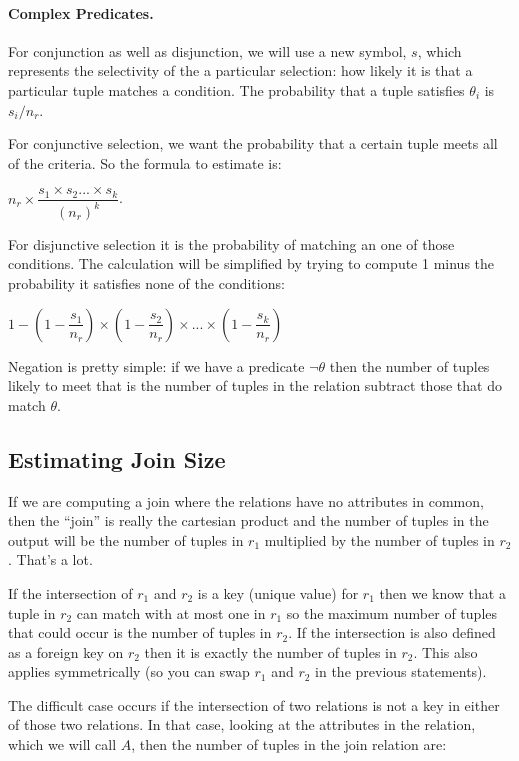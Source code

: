\documentclass[a4paper]{report}
\begin{document}
\paragraph{Complex Predicates.}
For conjunction as well as disjunction, we will use a new symbol, $s$, which represents the selectivity of the a particular selection: how likely it is that a particular tuple matches a condition. The probability that a tuple satisfies $\theta_{i}$ is $s_{i}/n_{r}$.

For conjunctive selection, we want the probability that a certain tuple meets all of the criteria. So the formula to estimate is:

$n_{r} \times \dfrac{s_{1} \times s_{2}... \times s_{k}}{(n_{r})^{k}}$.

For disjunctive selection it is the probability of matching an one of those conditions. The calculation will be simplified by trying to compute 1 minus the probability it satisfies none of the conditions: 

$1 - (1 - \dfrac{s_{1}}{n_{r}}) \times (1 - \dfrac{s_{2}}{n_{r}}) \times ... \times (1 - \dfrac{s_{k}}{n_{r}})$

Negation is pretty simple: if we have a predicate $\neg\theta$ then the number of tuples likely to meet that is the number of tuples in the relation subtract those that do match $\theta$.

\subsection*{Estimating Join Size}

If we are computing a join where the relations have no attributes in common, then the ``join'' is really the cartesian product and the number of tuples in the output will be the number of tuples in $r_{1}$ multiplied by the number of tuples in $r_{2}$. That's a lot.

If the intersection of $r_{1}$ and $r_{2}$ is a key (unique value) for $r_{1}$ then we know that a tuple in $r_{2}$ can match with at most one in $r_{1}$ so the maximum number of tuples that could occur is the number of tuples in $r_{2}$. If the intersection is also defined as a foreign key on $r_{2}$ then it is exactly the number of tuples in $r_{2}$. This also applies symmetrically (so you can swap $r_{1}$ and $r_{2}$ in the previous statements).

The difficult case occurs if the intersection of two relations is not a key in either of those two relations. In that case, looking at the attributes in the relation, which we will call $A$, then the number of tuples in the join relation are:
\end{document}
